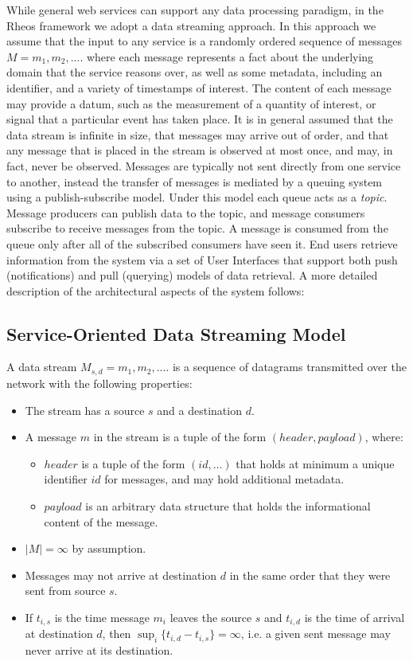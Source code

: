 While general web services can support any data processing paradigm, in the Rheos framework we adopt a data streaming approach\autocite{babcock2002models}. In this approach we assume that the input to any service is a randomly ordered sequence of messages $M = {m_1, m_2, ....}$ where each message represents a fact about the underlying domain that the service reasons over, as well as some metadata, including an identifier, and a variety of timestamps of interest. The content of each message may provide a datum, such as the measurement of a quantity of interest, or signal that a particular event has taken place. It is in general assumed that the data stream is infinite in size, that messages may arrive out of order, and that any message that is placed in the stream is observed at most once, and may, in fact, never be observed. Messages are typically not sent directly from one service to another, instead the transfer of messages is mediated by a queuing system using a publish-subscribe\autocite{eugster2003many} model. Under this model each queue acts as a \emph{topic}. Message producers can publish data to the topic, and message consumers subscribe to receive messages from the topic. A message is consumed from the queue only after all of the subscribed consumers have seen it. End users retrieve information from the system via a set of User Interfaces that support both push (notifications) and pull (querying) models of data retrieval. A more detailed description of the architectural aspects of the system follows:

\subsection{Service-Oriented Data Streaming Model}

A data stream $M_{s,d} = {m_1, m_2, ....}$ is a sequence of datagrams transmitted over the network with the following properties:

\begin{itemize}
    \item The stream has a source $s$ and a destination $d$.
    \item A message $m$ in the stream is a tuple of the form $(header, payload)$, where:
    \begin{itemize}
        \item $header$ is a tuple of the form $(id, \dots)$ that holds at minimum a unique identifier $id$ for messages, and may hold additional metadata.
        \item $payload$ is an arbitrary data structure that holds the informational content of the message. 
    \end{itemize}
    \item $|M| = \infty$ by assumption.
    \item Messages may not arrive at destination $d$ in the same order that they were sent from source $s$.
    \item If $t_{i,s}$ is the time message $m_i$ leaves the source $s$ and $t_{i,d}$ is the time of arrival at destination $d$, then $\sup_i \{t_{i,d} - t_{i,s}\} = \infty$, i.e. a given sent message may never arrive at its destination.
\end{itemize}

